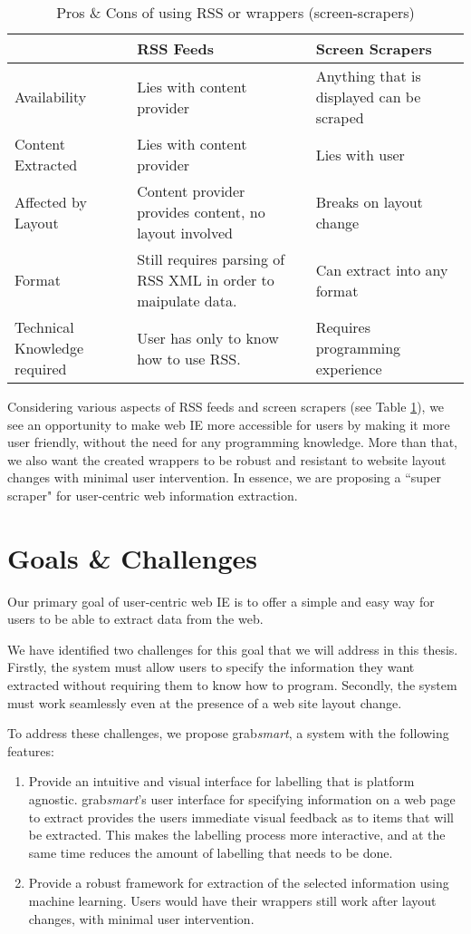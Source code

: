 \begin{table}[t]
\centering
\singlespacing
\small
\begin{tabular}{|p{3cm}|p{5cm}|p{5cm}|}
\hline
					&	RSS Feeds	&	Screen Scrapers \\
\hline
\hline
	Availability	&
	Lies with content provider &
	Anything that is displayed can be scraped \\
\hline
	Content Extracted &
	Lies with content provider &
	Lies with user \\
\hline
	Affected by Layout &
	Content provider provides content, no layout involved &
	Breaks on layout change \\
\hline
	Format &
	Still requires parsing of RSS XML in order to maipulate data. &
	Can extract into any format \\
\hline
	Technical Knowledge required &
	User has only to know how to use RSS. &
	Requires programming experience \\
	\hline
\end{tabular}
\caption{Pros \& Cons of using RSS or wrappers (screen-scrapers)}
\label{tab:procons}
\end{table}


Considering various aspects of RSS feeds and screen scrapers (see Table \ref{tab:procons}),
we see an opportunity to make web IE more accessible for 
users by making it more user friendly, without the need for any programming knowledge.
More than that, we also want the created wrappers to be robust and resistant to website layout
changes with minimal user intervention.
In essence, we are proposing a ``super scraper" for user-centric web information extraction.

\section{Goals \& Challenges}
Our primary goal of user-centric web IE is to offer a simple and easy way for users
to be able to extract data from the web. 

We have identified two challenges for this goal that we will address in this thesis.
Firstly, the system must allow users to specify the information
they want extracted without requiring them to know how to program.
Secondly, the system must work seamlessly even at the presence of a web site layout
change.

To address these challenges, we propose
grab\textit{smart}, a system with the following features:
	\begin{enumerate}
		\item Provide an intuitive and visual interface for labelling that is platform agnostic.
		grab\textit{smart}'s user interface for specifying information on a web page to extract
		 provides the users
		 immediate visual feedback as to items that will be extracted. This makes the labelling process more interactive, and at the
		 same time reduces the amount of labelling that needs to be done.
		\item Provide a robust framework for extraction of the selected information using
		machine learning. Users would have their wrappers still work after layout changes, with minimal
		user intervention.
	\end{enumerate}

